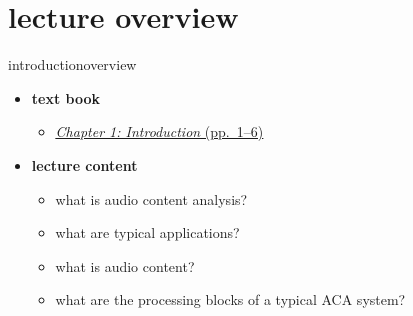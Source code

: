 


\subtitle{Part 2: Introduction}


	

    \section[overview]{lecture overview}
        \begin{frame}{introduction}{overview}
            \begin{itemize}
                \item   \textbf{text book}  
                    \begin{itemize}
                        \item   \href{http://ieeexplore.ieee.org/xpl/ebooks/bookPdfWithBanner.jsp?fileName=6331118.pdf&bkn=6266785&pdfType=chapter}{\underline{\textit{Chapter 1: Introduction} (pp.~1--6)}}
                    \end{itemize}
                \bigskip
                \item<2->   \textbf{lecture content}
                    \begin{itemize}
                        \item<2->   what is audio content analysis?
                        \item<3->   what are typical applications?
                        \item<4->   what is audio content?
                        \item<5->   what are the processing blocks of a typical ACA system?
                    \end{itemize}
            \end{itemize}
        \end{frame}
        
